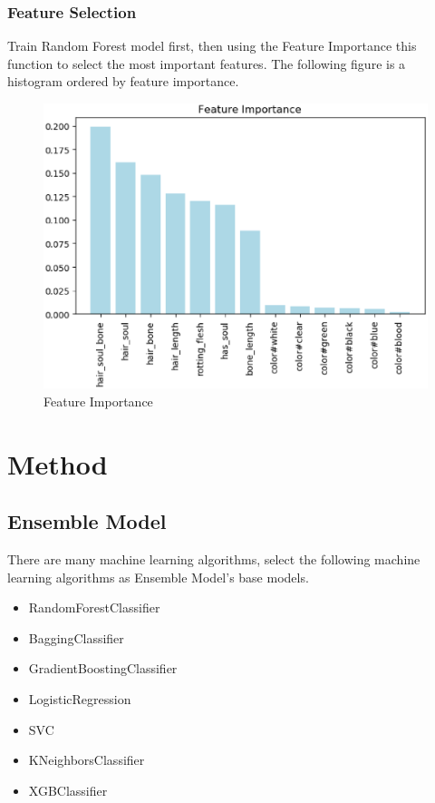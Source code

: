 \subsubsection{Feature Selection}


Train Random Forest model first, then using the Feature Importance this function to select the most important features. The following figure is a histogram ordered by feature importance. 


\begin{figure}[h]\centering
	\includegraphics[scale=0.3]{figures/FEATURE.eps}
	\caption{Feature Importance}
\end{figure}


\section{Method}

\subsection{Ensemble Model}
There are many machine learning algorithms, 
select the following machine learning algorithms as Ensemble Model’s base models. 

\begin{itemize}
	\item RandomForestClassifier
	\item BaggingClassifier
	\item GradientBoostingClassifier
	\item LogisticRegression
	\item SVC
	\item KNeighborsClassifier 
	\item XGBClassifier
\end{itemize}

